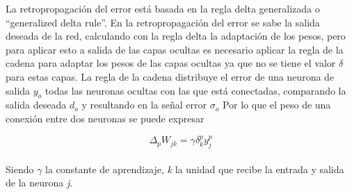 La retropropagación del error está basada en la regla delta generalizada o ``generalized delta rule''. En la retropropagación del error se sabe la salida deseada de la red, calculando con la regla delta la adaptación de los pesos, pero para aplicar esto a salida de las capas ocultas es necesario aplicar la regla de la cadena para adaptar los pesos de las capas ocultas ya que no se tiene el valor $\delta$ para estas capas. La regla de la cadena distribuye el error de una neurona de salida $y_o$ todas las neuronas ocultas con las que está conectadas, comparando la salida deseada $d_o$ y resultando en la señal error $\sigma_o$ Por lo que el peso de una conexión entre dos neuronas se puede expresar %

			\begin{equation}
			\Delta_{p}W_{jk}=\gamma \delta _{k}^{p}y_{j}^{p}
			\label{eq:ecuation_back1}
			\end{equation}\\

Siendo  $\gamma$ la constante de aprendizaje, \textit{k} la unidad que recibe la entrada y salida de la neurona \textit{j}.\\

